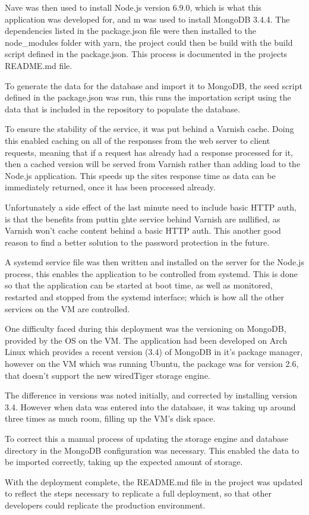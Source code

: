 Nave was then used to install Node.js version 6.9.0, which is what this application was developed for, and m was used to install MongoDB 3.4.4. The dependencies listed in the package.json file were then installed to the node\_modules folder with yarn, the project could then be build with the build script defined in the package.json. This process is documented in the projects README.md file.

To generate the data for the database and import it to MongoDB, the seed script defined in the package.json was run, this runs the importation script using the data that is included in the repository to populate the database.

To ensure the stability of the service, it was put behind a Varnish\cite{varnish} cache. Doing this enabled caching on all of the responses from the web server to client requests, meaning that if a request has already had a response processed for it, then a cached version will be served from Varnish rather than adding load to the Node.js application. This speeds up the sites response time as data can be immediately returned, once it has been processed already.

Unfortunately a side effect of the last minute need to include basic HTTP auth, is that the benefits from puttin ghte service behind Varnish are nullified, as Varnish won't cache content behind a basic HTTP auth. This another good reason to find a better solution to the password protection in the future.

A systemd\cite{systemd} service file was then written and installed on the server for the Node.js process, this enables the application to be controlled from systemd. This is done so that the application can be started at boot time, as well as monitored, restarted and stopped from the systemd interface; which is how all the other services on the VM are controlled.

One difficulty faced during this deployment was the versioning on MongoDB, provided by the OS on the VM. The application had been developed on Arch Linux which provides a recent version (3.4) of MongoDB in it's package manager, however on the VM which was running Ubuntu, the package was for version 2.6, that doesn't support the new wiredTiger\cite{tiger} storage engine. 

The difference in versions was noted initially, and corrected by installing version 3.4. However when data was entered into the database, it was taking up around three times as much room, filling up the VM's disk space. 

To correct this a manual process of updating the storage engine and database directory in the MongoDB configuration was necessary. This enabled the data to be imported correctly, taking up the expected amount of storage. 

With the deployment complete, the README.md file in the project was updated to reflect the steps necessary to replicate a full deployment, so that other developers could replicate the production environment. 
